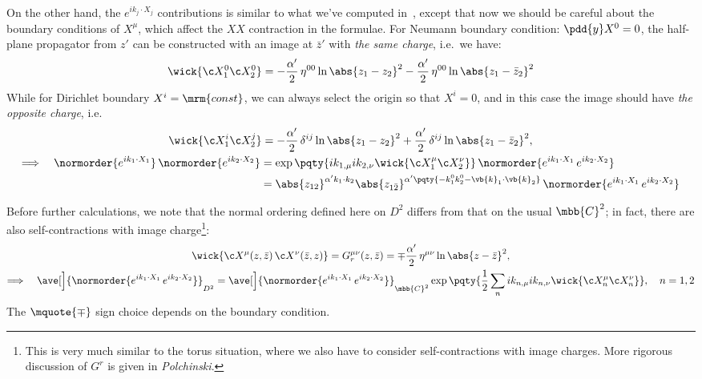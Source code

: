 \documentclass[a4paper,10pt]{article}
\begin{document}
\begin{enumerate}
\begin{enumerate}
	On the other hand, the $e^{ik_j\cdot X_j}$ contributions is similar to what we've computed in \,, except that now we should be careful about the boundary conditions of $X^\mu$, which affect the $XX$ contraction in the formulae. For Neumann boundary condition: $\pdd{y} X^0 = 0$, the half-plane propagator from $z'$ can be constructed with an image at $\bar{z}'$ with \textit{the same charge}, i.e.\ we have:
	\begin{equation}
		\wick{ \c X^0_1 \c X^0_2 }
		= - \frac{\alpha'}{2}\, \eta^{00}
				\ln \abs{z_1 - z_2}^2
			- \frac{\alpha'}{2}\, \eta^{00}
				\ln \abs{z_1 - \bar{z}_2}^2
	\end{equation}
	While for Dirichlet boundary $X^i = \mrm{const}$, we can always select the origin so that $X^i = 0$, and in this case the image should have \textit{the opposite charge}, i.e.
	\begin{gather}
		\wick{ \c X^i_1 \c X^j_2 }
		= - \frac{\alpha'}{2}\, \delta^{ij}
				\ln \abs{z_1 - z_2}^2
			+ \frac{\alpha'}{2}\, \delta^{ij}
				\ln \abs{z_1 - \bar{z}_2}^2,
	\\
	\begin{aligned}
		\Longrightarrow\quad
		\normorder{
			e^{ik_1\cdot X_1}
		}\,
		\normorder{
			e^{ik_2\cdot X_2}
		}
		&= \exp \pqty{
				ik_{1,\mu}
				ik_{2,\nu} 
				\wick{
					\c X^\mu_1
					\c X^\nu_2
				}
			}\, \normorder{
				e^{ik_1\cdot X_1}\,
				e^{ik_2\cdot X_2}
			} \\
		&= \abs{z_{12}}^{
				\alpha' k_1\cdot k_2
			}
			\abs{z_{1\bar{2}}}^{
				\alpha' \pqty{
					- k_1^0 k_2^0
					- \vb{k}_1 \cdot \vb{k}_2
				}
			}\, \normorder{
				e^{ik_1\cdot X_1}\,
				e^{ik_2\cdot X_2}
			}
	\end{aligned}
	\end{gather}
	
	Before further calculations, we note that the normal ordering defined here on $D^2$ differs from that on the usual $\mbb{C}^2$; in fact, there are also self-contractions with image charge\footnote{
		This is very much similar to the torus situation, where we also have to consider self-contractions with image charges. More rigorous discussion of $G^r$ is given in \textit{Polchinski}. 
	}:
	\begin{gather}
		\wick{ \c X^\mu(z,\bar{z})\, \c X^\nu(\bar{z},z) }
		= G^{\mu\nu}_r(z,\bar{z})
		= \mp \frac{\alpha'}{2}\, \eta^{\mu\nu}
				\ln \abs{z - \bar{z}}^2,
	\\
		\Longrightarrow\quad
		\ave[\Big]{\normorder{
				e^{ik_1\cdot X_1}\,
				e^{ik_2\cdot X_2}
			}}_{D^2}
		= \ave[\Big]{\normorder{
				e^{ik_1\cdot X_1}\,
				e^{ik_2\cdot X_2}
			}}_{\mbb{C}^2} 
			\exp \pqty{
				\frac{1}{2} \sum_n
				ik_{n,\mu}
				ik_{n,\nu} 
				\wick{
					\c X^\mu_n
					\c X^\nu_n
				}
			},\quad n = 1,2
	\end{gather}
	The $\mquote{\mp}$ sign choice depends on the boundary condition. 
	

\end{enumerate}
\end{enumerate}
\end{document}
